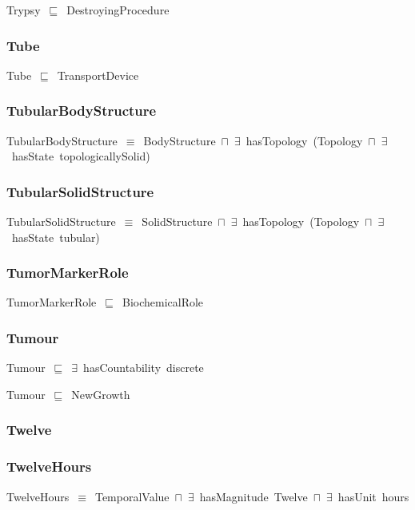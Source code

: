 \documentclass{article}
\begin{document}
Trypsy~\ensuremath{\sqsubseteq}~DestroyingProcedure~

\subsubsection*{Tube}

Tube~\ensuremath{\sqsubseteq}~TransportDevice~

\subsubsection*{TubularBodyStructure}

TubularBodyStructure~\ensuremath{\equiv}~BodyStructure~\ensuremath{\sqcap}~\ensuremath{\exists}~hasTopology~(Topology~\ensuremath{\sqcap}~\ensuremath{\exists}~hasState~topologicallySolid)

\subsubsection*{TubularSolidStructure}

TubularSolidStructure~\ensuremath{\equiv}~SolidStructure~\ensuremath{\sqcap}~\ensuremath{\exists}~hasTopology~(Topology~\ensuremath{\sqcap}~\ensuremath{\exists}~hasState~tubular)

\subsubsection*{TumorMarkerRole}

TumorMarkerRole~\ensuremath{\sqsubseteq}~BiochemicalRole~

\subsubsection*{Tumour}

Tumour~\ensuremath{\sqsubseteq}~\ensuremath{\exists}~hasCountability~discrete~

Tumour~\ensuremath{\sqsubseteq}~NewGrowth~

\subsubsection*{Twelve}

\subsubsection*{TwelveHours}

TwelveHours~\ensuremath{\equiv}~TemporalValue~\ensuremath{\sqcap}~\ensuremath{\exists}~hasMagnitude~Twelve~\ensuremath{\sqcap}~\ensuremath{\exists}~hasUnit~hours
\end{document}
